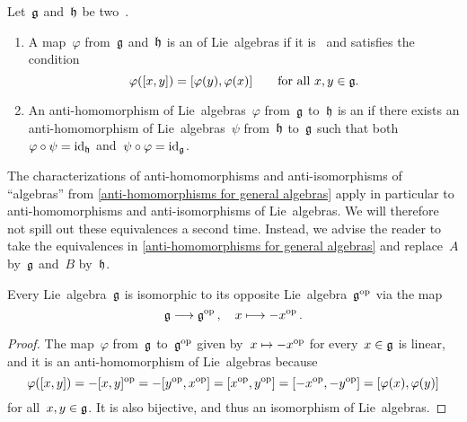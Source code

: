 \begin{definition}
	Let~$\mathfrak{g}$ and~$\mathfrak{h}$ be two~\liealgebras{$\kf$}.
	\begin{enumerate}
		\item
			A map~$\varphi$ from~$\mathfrak{g}$ and~$\mathfrak{h}$ is an  of Lie~algebras if it is~\linear{$\kf$} and satisfies the condition
			\[
				\varphi([x,y]) = [\varphi(y), \varphi(x)]
				\qquad
				\text{for all~$x, y \in \mathfrak{g}$.}
			\]
		\item
			An anti-homomorphism of Lie~algebras~$\varphi$ from~$\mathfrak{g}$ to~$\mathfrak{h}$ is an  if there exists an anti-homomorphism of Lie~algebras~$\psi$ from~$\mathfrak{h}$ to~$\mathfrak{g}$ such that both~$\varphi \circ \psi = \mathrm{id}_{\mathfrak{h}}$ and~$\psi \circ \varphi = \mathrm{id}_{\mathfrak{g}}$.
	\end{enumerate}
\end{definition}


\begin{remark}
	\label{characterizations of anti-homomorphisms for lie algebras}
	The characterizations of anti-homomorphisms and anti-isomorphisms of \enquote{algebras} from \cref{anti-homomorphisms for general algebras} apply in particular to anti-homomorphisms and anti-isomorphisms of Lie~algebras.
	We will therefore not spill out these equivalences a second time.
	Instead, we advise the reader to take the equivalences in \cref{anti-homomorphisms for general algebras} and replace~$A$ by~$\mathfrak{g}$ and~$B$ by~$\mathfrak{h}$.
\end{remark}


\begin{proposition}
	\label{lie algebra isomorphic to its opposite}
	Every Lie~algebra~$\mathfrak{g}$ is isomorphic to its opposite Lie~algebra~$\mathfrak{g}^{\mathrm{op}}$ via the map
	\[
		\glie
		\to
		\glie^{\op}\,,
		\quad
		x
		\mapsto
		-x^{\op}  \,.
	\]
\end{proposition}


\begin{proof}
	The map~$\varphi$ from~$\mathfrak{g}$ to~$\mathfrak{g}^{\mathrm{op}}$ given by~$x \mapsto -x^{\op}$ for every~$x \in \mathfrak{g}$ is linear, and it is an anti-homomorphism of Lie~algebras because
	\[
		\varphi([x, y])
		=
		-[x,y]^{\mathrm{op}}
		=
		-[ y^{\mathrm{op}}, x^{\mathrm{op}} ]
		=
		[ x^{\mathrm{op}}, y^{\mathrm{op}} ]
		=
		[ -x^{\mathrm{op}}, -y^{\mathrm{op}} ]
		=
		[ \varphi(x), \varphi(y) ]
	\]
	for all~$x, y \in \mathfrak{g}$.
	It is also bijective, and thus an isomorphism of Lie~algebras.
\end{proof}


